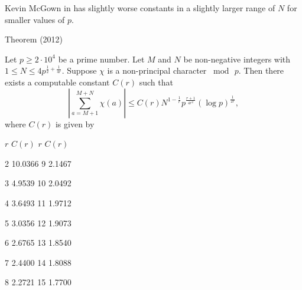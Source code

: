 Kevin McGown  in
\cite{McGown*12}
has slightly worse constants in a slightly larger range of $N$ for
smaller values of $p$.
\par 
\begin{thm}{Theorem (2012)}

Let $p\ge 2\cdot 10^{4}$ be a prime number. Let $M$ and $N$ be
non-negative integers with $1\le N\le 4 p^{\frac{1}{2} +
\frac{1}{4r}}$. Suppose $\chi$ is a non-principal character
$\bmod{\,p}$. Then there exists a computable constant $C(r)$ such that
$$
\left|\sum_{a=M+1}^{M+N}\chi(a)\right|
\le
C(r) N^{1-\frac{1}{r}} p^{\frac{r+1}{4r^2}}(\log{p})^{\frac{1}{2r}},
$$
where $C(r)$ is given by

  
    
      
	$r$
	$C(r)$
	$r$
	$C(r)$
      
    
    
      2
      10.0366
      9
      2.1467
    
    
      3
       4.9539
      10
      2.0492
    
    
      4
      3.6493
      11
      1.9712
    
    
      5
      3.0356
      12
      1.9073
    
    
      6
      2.6765
      13
      1.8540
    
    
      7
      2.4400
      14
      1.8088
    
    
      8
      2.2721
      15
      1.7700
    
  

\end{thm}

\par 


